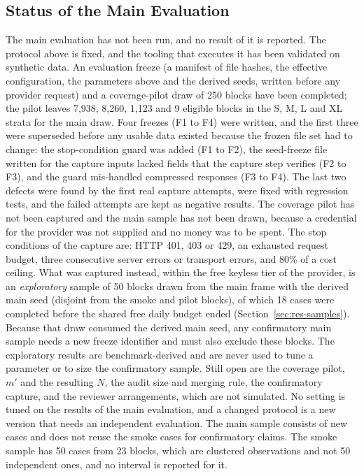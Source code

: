 \subsection{Status of the Main Evaluation}
\label{sec:main}
The main evaluation has not been run, and no result of it is reported. The protocol above is fixed, and the tooling that executes it has been validated on synthetic data. An evaluation freeze (a manifest of file hashes, the effective configuration, the parameters above and the derived seeds, written before any provider request) and a coverage-pilot draw of 250 blocks have been completed; the pilot leaves 7,938, 8,260, 1,123 and 9 eligible blocks in the S, M, L and XL strata for the main draw. Four freezes (F1 to F4) were written, and the first three were superseded before any usable data existed because the frozen file set had to change: the stop-condition guard was added (F1 to F2), the seed-freeze file written for the capture inputs lacked fields that the capture step verifies (F2 to F3), and the guard mis-handled compressed responses (F3 to F4). The last two defects were found by the first real capture attempts, were fixed with regression tests, and the failed attempts are kept as negative results. The coverage pilot has not been captured and the main sample has not been drawn, because a credential for the provider was not supplied and no money was to be spent. The stop conditions of the capture are: HTTP 401, 403 or 429, an exhausted request budget, three consecutive server errors or transport errors, and 80\% of a cost ceiling. What was captured instead, within the free keyless tier of the provider, is an \emph{exploratory} sample of 50 blocks drawn from the main frame with the derived main seed (disjoint from the smoke and pilot blocks), of which 18 cases were completed before the shared free daily budget ended (Section~\ref{sec:res-samples}). Because that draw consumed the derived main seed, any confirmatory main sample needs a new freeze identifier and must also exclude these blocks. The exploratory results are benchmark-derived and are never used to tune a parameter or to size the confirmatory sample. Still open are the coverage pilot, $m'$ and the resulting $N$, the audit size and merging rule, the confirmatory capture, and the reviewer arrangements, which are not simulated. No setting is tuned on the results of the main evaluation, and a changed protocol is a new version that needs an independent evaluation. The main sample consists of new cases and does not reuse the smoke cases for confirmatory claims. The smoke sample has 50 cases from 23 blocks, which are clustered observations and not 50 independent ones, and no interval is reported for it.
